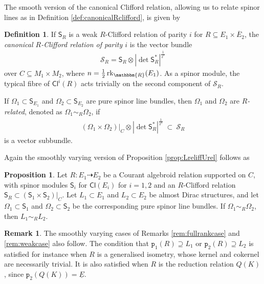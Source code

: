 \documentclass[a4paper, reqno, 11pt]{amsart}
\numberwithin{equation}{section}
\theoremstyle{definition}
\newtheorem{definition}[equation]{Definition}
\newtheorem{proposition}[equation]{Proposition}
\newtheorem{remark}[equation]{Remark}
\newcommand{\red}[1]{\underline{#1}}
\newcommand{\rmp}{\mathtt{p}}
\newcommand{\IR}{\mathbbm{R}}
\newcommand{\Cl}{\mathsf{Cl}}
\newcommand{\cS}{{\mathcal S}}
\newcommand{\sfS}{{\mathsf{S}}}
\newcommand{\rel}{\dashrightarrow}
\newcommand{\rk}{\mathrm{rk}}
\theoremstyle{remark}
\begin{document}
The smooth version of the canonical Clifford relation, allowing us to relate spinor lines as in Definition \ref{def:canonicalRclifford}, is given by

\begin{definition}
    If $\sfS_R$ is a weak $R$-Clifford relation of parity $i$ for $R \subseteq E_1 \times \overline{E}_2$, the \emph{canonical $R$-Clifford relation of parity $i$} is the vector bundle
    \begin{align}
    \cS_R = \sfS_R \otimes |\det \sfS_R^* |^{\frac{1}{2^n}}
\end{align}
over $C \subseteq M_1 \times M_2$, where $n = \frac12\,\rk_\IR(E_1)$. As a spinor module, the typical fibre of $\Cl^i(R)$ acts trivially on the second component of $\cS_R$.

If $\Omega_1 \subset \sfS_{E_1}$ and $\Omega_2 \subset \sfS_{E_2}$ are pure spinor line bundles, then $\Omega_1$ and $\Omega_2$ are \emph{$R$-related}, denoted as $\Omega_1 \sim_R \Omega_2$, if
\begin{align}
    (\Omega_1 \times \Omega_2)\big\rvert_C\otimes |\det \sfS_R^* |^{\frac{1}{2^n}} \ \subset \ \cS_R
\end{align}
is a vector subbundle.
\end{definition}

Again the smoothly varying version of Proposition \ref{prop:LreliffUrel} follows as

\begin{proposition}\label{prop:LreliffUrelsmooth}
    Let $R \colon E_1 \rel E_2$ be a Courant algebroid relation supported on $C$, with spinor modules $\sfS_i$ for $\Cl(E_i)$ for $i=1,2$ and an $R$-Clifford relation $\sfS_R \subset (\sfS_1 \times \sfS_2) \rvert_C$. Let $L_1 \subset E_1$ and $L_2 \subset E_2$ be almost Dirac structures, and let $\Omega_1 \subset \sfS_1$ and $\Omega_2 \subset \sfS_2$ be the corresponding pure spinor line bundles. If $\Omega_1 \sim_R \Omega_2$, then $L_1 \sim_R L_2$. 
\end{proposition}

\begin{remark}\label{rem:smoothULequiv}
    The smoothly varying cases of Remarks \ref{rem:fullrankcase} and \ref{rem:weakcase} also follow. The condition that $\rmp_1(R) \supseteq L_1$ or $\rmp_2(R) \supseteq L_2$ is satisfied for instance when $R$ is a generalised isometry, whose kernel and cokernel are necessarily trivial. It is also satisfied when $R$ is the reduction relation $Q(K)$, since $\rmp_2(Q(K)) = \red E$.
\end{remark}
\end{document}
